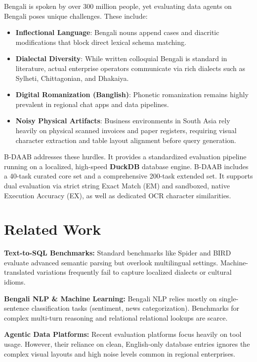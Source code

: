 \documentclass{article}
\begin{document}
Bengali is spoken by over 300 million people, yet evaluating data agents on Bengali poses unique challenges. These include:
\begin{itemize}
    \item \textbf{Inflectional Language}: Bengali nouns append cases and diacritic modifications that block direct lexical schema matching.
    \item \textbf{Dialectal Diversity}: While written colloquial Bengali is standard in literature, actual enterprise operators communicate via rich dialects such as Sylheti, Chittagonian, and Dhakaiya.
    \item \textbf{Digital Romanization (Banglish)}: Phonetic romanization remains highly prevalent in regional chat apps and data pipelines.
    \item \textbf{Noisy Physical Artifacts}: Business environments in South Asia rely heavily on physical scanned invoices and paper registers, requiring visual character extraction and table layout alignment before query generation.
\end{itemize}

B-DAAB addresses these hurdles. It provides a standardized evaluation pipeline running on a localized, high-speed \textbf{DuckDB} database engine. B-DAAB includes a 40-task curated core set and a comprehensive 200-task extended set. It supports dual evaluation via strict string Exact Match (EM) and sandboxed, native Execution Accuracy (EX), as well as dedicated OCR character similarities.

\section{Related Work}
\textbf{Text-to-SQL Benchmarks:} Standard benchmarks like Spider and BIRD evaluate advanced semantic parsing but overlook multilingual settings. Machine-translated variations frequently fail to capture localized dialects or cultural idioms.

\textbf{Bengali NLP & Machine Learning:} Bengali NLP relies mostly on single-sentence classification tasks (sentiment, news categorization). Benchmarks for complex multi-turn reasoning and relational relational lookups are scarce.

\textbf{Agentic Data Platforms:} Recent evaluation platforms focus heavily on tool usage. However, their reliance on clean, English-only database entries ignores the complex visual layouts and high noise levels common in regional enterprises.
\end{document}
